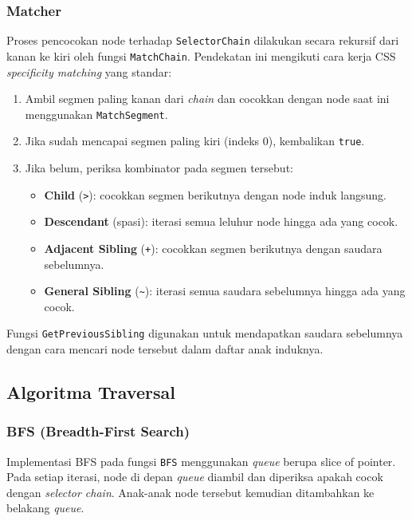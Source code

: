 \subsubsection{Matcher}

Proses pencocokan node terhadap \texttt{SelectorChain} dilakukan secara rekursif dari kanan ke kiri oleh fungsi \texttt{MatchChain}. Pendekatan ini mengikuti cara kerja CSS \textit{specificity matching} yang standar:

\begin{enumerate}
    \item Ambil segmen paling kanan dari \textit{chain} dan cocokkan dengan node saat ini menggunakan \texttt{MatchSegment}.
    \item Jika sudah mencapai segmen paling kiri (indeks 0), kembalikan \texttt{true}.
    \item Jika belum, periksa kombinator pada segmen tersebut:
    \begin{itemize}
        \item \textbf{Child} (\texttt{>}): cocokkan segmen berikutnya dengan node induk langsung.
        \item \textbf{Descendant} (spasi): iterasi semua leluhur node hingga ada yang cocok.
        \item \textbf{Adjacent Sibling} (\texttt{+}): cocokkan segmen berikutnya dengan saudara sebelumnya.
        \item \textbf{General Sibling} (\texttt{\textasciitilde}): iterasi semua saudara sebelumnya hingga ada yang cocok.
    \end{itemize}
\end{enumerate}

Fungsi \texttt{GetPreviousSibling} digunakan untuk mendapatkan saudara sebelumnya dengan cara mencari node tersebut dalam daftar anak induknya.

\subsection{Algoritma Traversal}

\subsubsection{BFS (Breadth-First Search)}

Implementasi BFS pada fungsi \texttt{BFS} menggunakan \textit{queue} berupa slice of pointer. Pada setiap iterasi, node di depan \textit{queue} diambil dan diperiksa apakah cocok dengan \textit{selector chain}. Anak-anak node tersebut kemudian ditambahkan ke belakang \textit{queue}.

